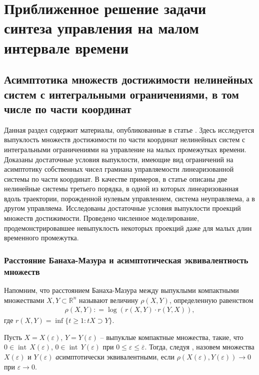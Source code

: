 \documentclass[../main.tex]{subfiles}
\begin{document}
\clearpage
\section{Приближенное решение задачи синтеза управления на малом интервале времени}
\subsection{Асимптотика множеств достижимости нелинейных систем с интегральными ограничениями, в том числе по части координат} 
Данная раздел содержит материалы, опубликованные в статье \cite{Osipov}. Здесь исследуется выпуклость множеств достижимости по части координат нелинейных систем с интегральными ограничениями на управление на малых промежутках времени.
Доказаны достаточные условия выпуклости, имеющие вид ограничений на асимптотику собственных чисел грамиана управляемости линеаризованной системы по части координат.
В качестве примеров, в статье описаны две нелинейные системы третьего порядка, в одной из которых линеаризованная вдоль траектории, порожденной нулевым управлением, система неуправляема, а в другом управляема.
Исследованы достаточные условия выпуклости проекций множеств достижимости. 
Проведено численное моделирование, продемонстрировавшее невыпуклость некоторых проекций даже для малых длин временного промежутка.
\subsubsection{Расстояние Банаха-Мазура и асимптотическая эквивалентность множеств}\label{sec21:AsymptoticEquality}
Напомним, что расстоянием Банаха-Мазура между выпуклыми компактными множествами $ X,Y \subset \mathbb R^n $ называют величину $ \rho (X, Y)  $, определенную равенством 
\begin{gather*}
	\rho (X, Y): = \log (r(X,Y) \cdot r(Y, X)),
\end{gather*}
где $r(X, Y) = \inf \{t \geq 1: tX \supset Y \}$.

Пусть $ X = X(\varepsilon) $,  $ Y = Y(\varepsilon) $ -- выпуклые компактные множества, такие, что $ 0 \in \operatorname{int}\,X(\varepsilon) $, $ 0 \in \operatorname{int}\,Y(\varepsilon) $ при $0 \leqslant \varepsilon \leqslant \overline{\varepsilon} $.  Тогда, следуя \cite{Ovs}, назовем множества $  X(\varepsilon)  $ и $  Y(\varepsilon) $ {\textit асимптотически эквивалентными}, если $  \rho (X(\varepsilon), Y(\varepsilon)) \rightarrow 0 $ при $\varepsilon \rightarrow 0 $.
\end{document}
